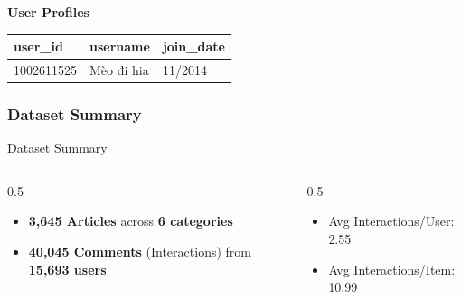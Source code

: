 \documentclass{beamer}
\begin{document}
\begin{frame}
    \vspace{0.9em}

    \textbf{User Profiles}\par\vspace{0.3em}

    \centering
    \begin{tabular}{|l|l|l|}
        \hline
        \rowcolor{headUsers}
        \textbf{user\_id} & \textbf{username} & \textbf{join\_date} \\
        \hline
        1002611525        & Mèo đi hia        & 11/2014             \\
        \hline
    \end{tabular}

\end{frame}



\begin{frame}
    \frametitle{Dataset Summary}

    \begin{block}{Dataset Summary}
        \begin{columns}[T,onlytextwidth]

            \begin{column}{0.5\textwidth}
                \begin{itemize}
                    \item \textbf{3,645 Articles} across \textbf{6 categories}
                    \item \textbf{40,045 Comments} (Interactions) from \textbf{15,693 users}
                \end{itemize}
            \end{column}

            \begin{column}{0.5\textwidth}
                \begin{itemize}
                    \item Avg Interactions/User:  2.55
                    \item Avg Interactions/Item:  10.99
                \end{itemize}
            \end{column}

        \end{columns}
    \end{block}

    \vspace{0.25cm}


\end{frame}
\end{document}
